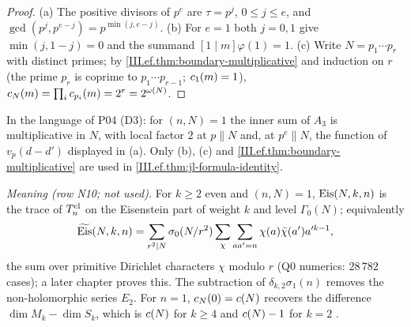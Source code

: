 \begin{theorem}
\end{theorem}
\begin{proof}
(a) The positive divisors of $p^e$ are $\tau=p^j$, $0\le j\le e$, and $\gcd(p^j,p^{e-j})=p^{\min(j,e-j)}$. (b) For $e=1$ both $j=0,1$ give
$\min(j,1-j)=0$ and the summand $[1\mid m]\varphi(1)=1$. (c) Write $N=p_1\cdots p_r$ with distinct primes; by \cref{III.ef.thm:boundary-multiplicative}
and induction on $r$ (the prime $p_r$ is coprime to $p_1\cdots p_{r-1}$; $c_1(m)=1$), $c_N(m)=\prod_ic_{p_i}(m)=2^r=2^{\omega(N)}$.
\end{proof}
\begin{remark}
In the language of P04 (D3): for $(n,N)=1$ the inner sum of $A_3$ is multiplicative in $N$, with local factor $2$ at $p\parallel N$ and, at $p^e\parallel N$,
the function of $v_p(d-d')$ displayed in (a). Only (b), (c) and \cref{III.ef.thm:boundary-multiplicative} are used in \cref{III.ef.thm:jl-formula-identity}.
\end{remark}

\begin{definition}
\end{definition}

\begin{definition}
\end{definition}
\noindent \emph{Meaning (row N10; not used).} For $k\ge2$ even and $(n,N)=1$, $\mathrm{Eis}(N,k,n)$ is the trace of $T^{\mathrm{cl}}_n$ on the Eisenstein part of
weight $k$ and level $\Gamma_0(N)$; equivalently \[\widetilde{\mathrm{Eis}}(N,k,n)=\sum_{r^2\mid N}\sigma_0(N/r^2)\sum_{\chi}\sum_{aa'=n}\chi(a)\bar\chi(a')a'^{k-1},\]
the sum over
primitive Dirichlet characters $\chi$ modulo $r$ (Q0 numerics: $28\,782$ cases); a later chapter proves this. The subtraction of
$\delta_{k,2}\sigma_1(n)$ removes the non-holomorphic series $E_2$. For $n=1$, $c_N(0)=c(N)$ recovers the difference
$\dim M_k-\dim S_k$, which is $c(N)$ for $k\ge4$ and $c(N)-1$ for $k=2$ \cite[Thm.~1, pp.~71--72]{CO}.

